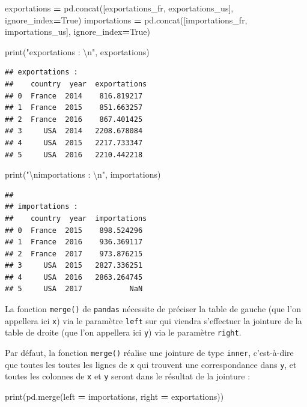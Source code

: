 \documentclass[
  12pt,
]{book}
\newenvironment{Shaded}{\begin{snugshade}}{\end{snugshade}}
\newcommand{\BuiltInTok}[1]{#1}
\newcommand{\CharTok}[1]{\textcolor[rgb]{0.31,0.60,0.02}{#1}}
\newcommand{\NormalTok}[1]{#1}
\newcommand{\OperatorTok}[1]{\textcolor[rgb]{0.81,0.36,0.00}{\textbf{#1}}}
\newcommand{\StringTok}[1]{\textcolor[rgb]{0.31,0.60,0.02}{#1}}
\newcommand{\VariableTok}[1]{\textcolor[rgb]{0.00,0.00,0.00}{#1}}
\numberwithin{equation}{section}
\numberwithin{countremarque}{section}
\begin{document}
\begin{Shaded}
\begin{Highlighting}[]
\NormalTok{exportations }\OperatorTok{=}\NormalTok{ pd.concat([exportations\_fr, exportations\_us], ignore\_index}\OperatorTok{=}\VariableTok{True}\NormalTok{)}
\NormalTok{importations }\OperatorTok{=}\NormalTok{ pd.concat([importations\_fr, importations\_us], ignore\_index}\OperatorTok{=}\VariableTok{True}\NormalTok{)}

\BuiltInTok{print}\NormalTok{(}\StringTok{"exportations : }\CharTok{\textbackslash{}n}\StringTok{"}\NormalTok{, exportations)}
\end{Highlighting}
\end{Shaded}

\begin{lstlisting}
## exportations : 
##    country  year  exportations
## 0  France  2014    816.819217
## 1  France  2015    851.663257
## 2  France  2016    867.401425
## 3     USA  2014   2208.678084
## 4     USA  2015   2217.733347
## 5     USA  2016   2210.442218
\end{lstlisting}

\begin{Shaded}
\begin{Highlighting}[]
\BuiltInTok{print}\NormalTok{(}\StringTok{"}\CharTok{\textbackslash{}n}\StringTok{importations : }\CharTok{\textbackslash{}n}\StringTok{"}\NormalTok{, importations)}
\end{Highlighting}
\end{Shaded}

\begin{lstlisting}
## 
## importations : 
##    country  year  importations
## 0  France  2015    898.524296
## 1  France  2016    936.369117
## 2  France  2017    973.876215
## 3     USA  2015   2827.336251
## 4     USA  2016   2863.264745
## 5     USA  2017           NaN
\end{lstlisting}

La fonction \texttt{merge()} de \texttt{pandas} nécessite de préciser la table de gauche (que l'on appellera ici \texttt{x}) via le paramètre \texttt{left} sur qui viendra s'effectuer la jointure de la table de droite (que l'on appellera ici \texttt{y}) via le paramètre \texttt{right}.

Par défaut, la fonction \texttt{merge()} réalise une jointure de type \texttt{inner}, c'est-à-dire que toutes les toutes les lignes de \texttt{x} qui trouvent une correspondance dans \texttt{y}, et toutes les colonnes de \texttt{x} et \texttt{y} seront dans le résultat de la jointure :

\begin{Shaded}
\begin{Highlighting}[]
\BuiltInTok{print}\NormalTok{(pd.merge(left }\OperatorTok{=}\NormalTok{ importations, right }\OperatorTok{=}\NormalTok{ exportations))}
\end{Highlighting}
\end{Shaded}
\end{document}
